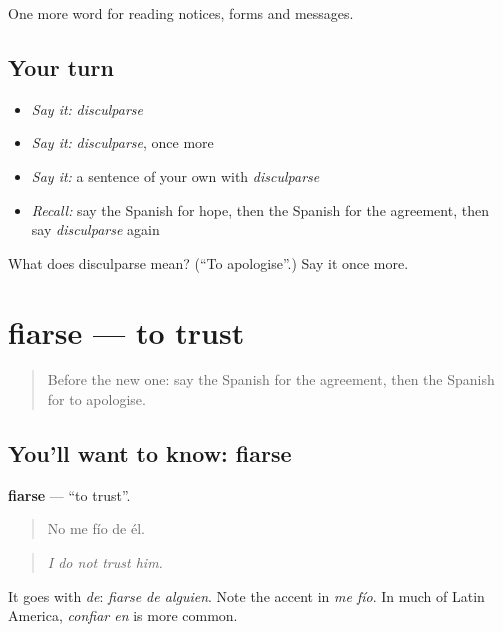 \begin{grammarlens}[title={What you've built}]
One more word for reading notices, forms and messages.
\end{grammarlens}

\subsection*{Your turn}
\begin{itemize}
\raggedright
  \item \emph{Say it:} \emph{disculparse}
  \item \emph{Say it:} \emph{disculparse}, once more
  \item \emph{Say it:} a sentence of your own with \emph{disculparse}
  \item \emph{Recall:} say the Spanish for hope, then the Spanish for the agreement, then say \emph{disculparse} again
\end{itemize}

\begin{tcolorbox}[breakable,colback=teal!4,colframe=teal!35!black,title={Before you move on}]
What does disculparse mean? (\textquotedblleft{}To apologise\textquotedblright{}.) Say it once more.
\end{tcolorbox}
\section[fiarse]{fiarse — to trust}

\label{lesson:ES-C510-fiarse}



\begin{quote}
Before the new one: say the Spanish for the agreement, then the Spanish for to apologise.
\end{quote}

\subsection*{You'll want to know: fiarse}
\textbf{fiarse} — \textquotedblleft{}to trust\textquotedblright{}.

\begin{quote}
No me fío de él.
\end{quote}

\begin{quote}
\emph{I do not trust him.}
\end{quote}

It goes with \emph{de}: \emph{fiarse de alguien}. Note the accent in \emph{me fío}. In much of Latin America, \emph{confiar en} is more common.


